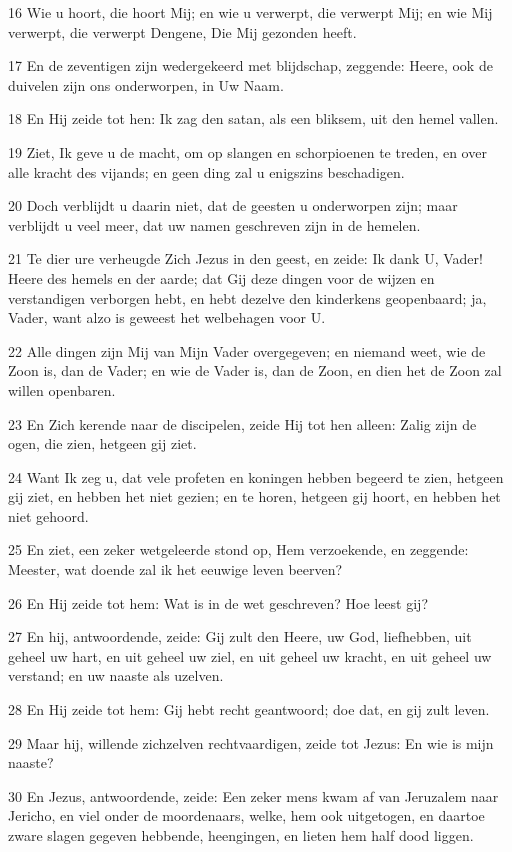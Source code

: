 \par 16 Wie u hoort, die hoort Mij; en wie u verwerpt, die verwerpt Mij; en wie Mij verwerpt, die verwerpt Dengene, Die Mij gezonden heeft.
\par 17 En de zeventigen zijn wedergekeerd met blijdschap, zeggende: Heere, ook de duivelen zijn ons onderworpen, in Uw Naam.
\par 18 En Hij zeide tot hen: Ik zag den satan, als een bliksem, uit den hemel vallen.
\par 19 Ziet, Ik geve u de macht, om op slangen en schorpioenen te treden, en over alle kracht des vijands; en geen ding zal u enigszins beschadigen.
\par 20 Doch verblijdt u daarin niet, dat de geesten u onderworpen zijn; maar verblijdt u veel meer, dat uw namen geschreven zijn in de hemelen.
\par 21 Te dier ure verheugde Zich Jezus in den geest, en zeide: Ik dank U, Vader! Heere des hemels en der aarde; dat Gij deze dingen voor de wijzen en verstandigen verborgen hebt, en hebt dezelve den kinderkens geopenbaard; ja, Vader, want alzo is geweest het welbehagen voor U.
\par 22 Alle dingen zijn Mij van Mijn Vader overgegeven; en niemand weet, wie de Zoon is, dan de Vader; en wie de Vader is, dan de Zoon, en dien het de Zoon zal willen openbaren.
\par 23 En Zich kerende naar de discipelen, zeide Hij tot hen alleen: Zalig zijn de ogen, die zien, hetgeen gij ziet.
\par 24 Want Ik zeg u, dat vele profeten en koningen hebben begeerd te zien, hetgeen gij ziet, en hebben het niet gezien; en te horen, hetgeen gij hoort, en hebben het niet gehoord.
\par 25 En ziet, een zeker wetgeleerde stond op, Hem verzoekende, en zeggende: Meester, wat doende zal ik het eeuwige leven beerven?
\par 26 En Hij zeide tot hem: Wat is in de wet geschreven? Hoe leest gij?
\par 27 En hij, antwoordende, zeide: Gij zult den Heere, uw God, liefhebben, uit geheel uw hart, en uit geheel uw ziel, en uit geheel uw kracht, en uit geheel uw verstand; en uw naaste als uzelven.
\par 28 En Hij zeide tot hem: Gij hebt recht geantwoord; doe dat, en gij zult leven.
\par 29 Maar hij, willende zichzelven rechtvaardigen, zeide tot Jezus: En wie is mijn naaste?
\par 30 En Jezus, antwoordende, zeide: Een zeker mens kwam af van Jeruzalem naar Jericho, en viel onder de moordenaars, welke, hem ook uitgetogen, en daartoe zware slagen gegeven hebbende, heengingen, en lieten hem half dood liggen.
